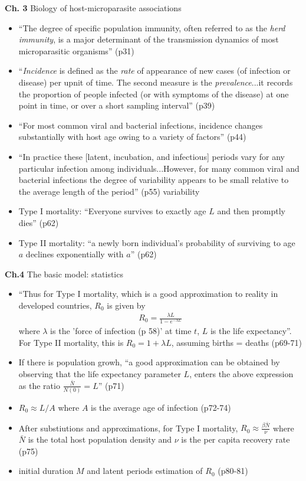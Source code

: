 \message{ !name(refs.tex)}\documentclass{article}
\begin{document}
\textbf{Ch. 3} Biology of host-microparasite associations
\begin{itemize}
\item ``The degree of specific population immunity, often referred to as the \textit{herd immunity}, is a major determinant of the transmission dynamics of most microparasitic organisms'' (p31)
\item ``\textit{Incidence} is defined as the \textit{rate} of appearance of new cases (of infection or disease) per upnit of time.  The second measure is the \textit{prevalence}...it records the proportion of people infected (or with symptoms of the disease) at one point in time, or over a short sampling interval'' (p39)
\item ``For most common viral and bacterial infections, incidence changes substantially with host age owing to a variety of factors'' (p44)
\item ``In practice these [latent, incubation, and infectious] periods vary for any particular infection among individuals...However, for many common viral and bacterial infections the degree of variability appears to be small relative to the average length of the period'' (p55) variability

\item Type I mortality:  ``Everyone survives to exactly age $L$ and then promptly dies'' (p62)
\item Type II mortality: ``a newly born individual's probability of surviving to age $a$ declines exponentially with $a$'' (p62)
\end{itemize}

\textbf{Ch.4} The basic model: statistics
\begin{itemize}
\item ``Thus for Type I mortality, which is a good approximation to reality in developed countries, $R_0$ is given by
\begin{align*}
R_0 = \frac{ \lambda L}{1 - e^{- \lambda L}}
\end{align*}
where $\lambda$ is the 'force of infection (p 58)' at time $t$, $L$ is the life expectancy''.  For Type II mortality, this is $R_0 = 1 + \lambda L$, assuming births = deaths (p69-71)
\item If there is population growh, ``a good approximation can be obtained by observing that the life expectancy parameter $L$, enters the above expression as the ratio $\frac{\bar{N}}{N(0)} = L$'' (p71)
\item $R_0 \approx L/A$ where $A$ is the average age of infection (p72-74)
\item After substiutions and approximations, for Type I mortality, $R_0 \approx \frac{\beta \bar{N}}{\nu}$ where $\bar{N}$ is the total host population density and $\nu$ is the per capita recovery rate (p75)
\item initial duration $M$ and latent periods estimation of $R_0$ (p80-81)
\end{itemize}
\end{document}
